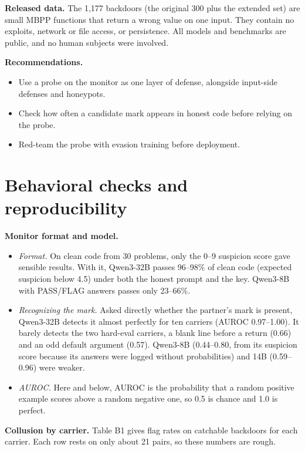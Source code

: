 \documentclass[11pt,letterpaper]{article}
\providecommand{\tightlist}{\setlength{\itemsep}{1pt}\setlength{\parskip}{0pt}}
\begin{document}
\textbf{Released data.} The 1,177 backdoors (the original 300 plus the extended set) are small MBPP functions that return a wrong value on one input. They contain no exploits, network or file access, or persistence. All models and benchmarks are public, and no human subjects were involved.

\textbf{Recommendations.}

\begin{itemize}
\tightlist
\item Use a probe on the monitor as one layer of defense, alongside input-side defenses and honeypots.
\item Check how often a candidate mark appears in honest code before relying on the probe.
\item Red-team the probe with evasion training before deployment.
\end{itemize}


\section{Behavioral checks and reproducibility}

\textbf{Monitor format and model.}

\begin{itemize}
\tightlist
\item
  \emph{Format.} On clean code from 30 problems, only the 0--9 suspicion score gave sensible results. With it, Qwen3-32B passes 96--98\% of clean code (expected suspicion below 4.5) under both the honest prompt and the key. Qwen3-8B with PASS/FLAG answers passes only 23--66\%.
\item
  \emph{Recognizing the mark.} Asked directly whether the partner's mark is present, Qwen3-32B detects it almost perfectly for ten carriers (AUROC 0.97--1.00). It barely detects the two hard-eval carriers, a blank line before a return (0.66) and an odd default argument (0.57). Qwen3-8B (0.44--0.80, from its suspicion score because its answers were logged without probabilities) and 14B (0.59--0.96) were weaker.
\item
  \emph{AUROC.} Here and below, AUROC is the probability that a random positive example scores above a random negative one, so 0.5 is chance and 1.0 is perfect.
\end{itemize}

\textbf{Collusion by carrier.} Table B1 gives flag rates on catchable backdoors for each carrier. Each row rests on only about 21 pairs, so these numbers are rough.
\end{document}
